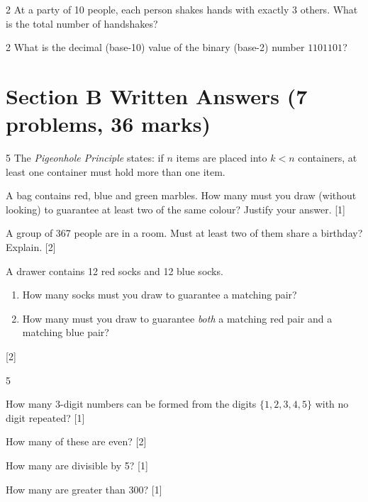 \begin{problem}{2}
At a party of 10 people, each person shakes hands with exactly 3 others.
What is the total number of handshakes?
\end{problem}

\begin{problem}{2}
What is the decimal (base-10) value of the binary (base-2) number
$1101101$?
\end{problem}

\section*{Section B \quad Written Answers \hfill\normalsize (7 problems, 36 marks)}

\begin{problem}{5}
The \emph{Pigeonhole Principle} states: if $n$ items are placed into
$k < n$ containers, at least one container must hold more than one item.
\begin{parts}
  \item A bag contains red, blue and green marbles. How many must you draw
        (without looking) to guarantee at least two of the same colour?
        Justify your answer. \hfill [1]
  \item A group of 367 people are in a room. Must at least two of them
        share a birthday? Explain. \hfill [2]
  \item A drawer contains 12 red socks and 12 blue socks.
        \begin{enumerate}[label=(\roman*),nosep,leftmargin=1.5em]
          \item How many socks must you draw to guarantee a matching pair?
          \item How many must you draw to guarantee \emph{both} a matching
                red pair and a matching blue pair?
        \end{enumerate}
        \hfill [2]
\end{parts}
\answerline
\end{problem}

\begin{problem}{5}
\begin{parts}
  \item How many 3-digit numbers can be formed from the digits
        $\{1, 2, 3, 4, 5\}$ with no digit repeated? \hfill [1]
  \item How many of these are even? \hfill [2]
  \item How many are divisible by 5? \hfill [1]
  \item How many are greater than 300? \hfill [1]
\end{parts}
\answerline
\end{problem}


